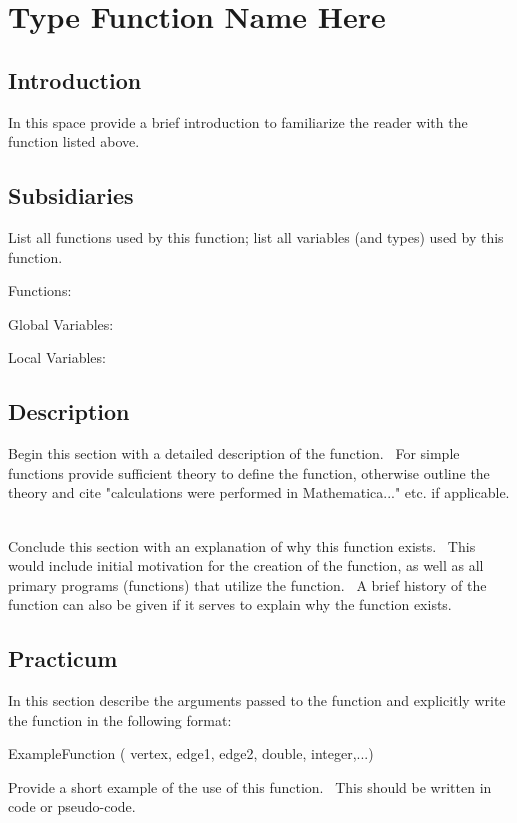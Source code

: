 \documentclass[12pt]{article}%
\begin{document}
\section*{Type Function Name Here}

\subsection*{Introduction}

In this space provide a brief introduction to familiarize the reader with the
function listed above. \ 

\subsection*{Subsidiaries}

List all functions used by this function; list all variables (and types) used
by this function.

Functions:

Global Variables:

Local Variables:

\subsection*{Description}

Begin this section with a detailed description of the function. \ For simple
functions provide sufficient theory to define the function, otherwise outline
the theory and cite "calculations were performed in Mathematica..." etc. if
applicable. \ 

Conclude this section with an explanation of why this function exists. \ This
would include initial motivation for the creation of the function, as well as
all primary programs (functions) that utilize the function. \ A brief history
of the function can also be given if it serves to explain why the function
exists. \ 

\subsection*{Practicum}

In this section describe the arguments passed to the function and explicitly
write the function in the following format:

ExampleFunction ( vertex, edge1, edge2, double, integer,...)

Provide a short example of the use of this function. \ This should be written
in code or pseudo-code. \ 
\end{document}
